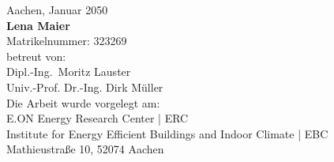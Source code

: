 \begin{titlepage}
\vfill
\begin{center}
\begingroup
{}\selectfont
Aachen, Januar 2050\\
\addvspace{0.5cm}
\textbf{Lena Maier} \\
Matrikelnummer: 323269 \\
\addvspace{0.5cm}
betreut von:\\
Dipl.-Ing.~Moritz Lauster \\
Univ.-Prof. Dr.-Ing. Dirk Müller \\
\addvspace{0.5cm}
Die Arbeit wurde vorgelegt am:\\
E.ON Energy Research Center | ERC \\
Institute for Energy Efficient Buildings and Indoor Climate | EBC\\
Mathieustraße 10, 52074 Aachen\\
\endgroup
\end{center}

\end{titlepage}
